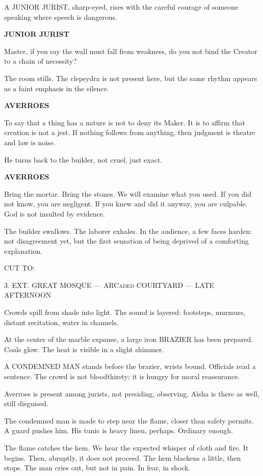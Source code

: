 \documentclass[12pt]{article}
\newlength{\charindent}
\newlength{\dialogueindent}
\newlength{\dialoguewidth}
\newlength{\transitionindent}
\newcommand{\slug}[1]{\vspace{1.25em}\textsc{#1}\vspace{0.5em}}
\newcommand{\action}[1]{#1}
\newcommand{\character}[1]{%
  \par\vspace{0.75em}%
  \hspace*{\charindent}\textbf{#1}%
}
\newcommand{\dialogue}[1]{%
  \par\nobreak
  \hspace*{\dialogueindent}%
  \begin{minipage}[t]{\dialoguewidth}
  #1
  \end{minipage}
}
\newcommand{\transition}[1]{%
  \par\vspace{1em}%
  \hspace*{\transitionindent}\textsc{#1}%
}
\begin{document}
\action{A JUNIOR JURIST, sharp-eyed, rises with the careful courage of someone speaking where speech is dangerous.}

\character{JUNIOR JURIST}
\dialogue{Master, if you say the wall must fall from weakness, do you not bind the Creator to a chain of necessity?}

\action{The room stills. The clepsydra is not present here, but the same rhythm appears as a faint emphasis in the silence.}

\character{AVERROES}
\dialogue{To say that a thing has a nature is not to deny its Maker. It is to affirm that creation is not a jest. If nothing follows from anything, then judgment is theatre and law is noise.}

\action{He turns back to the builder, not cruel, just exact.}

\character{AVERROES}
\dialogue{Bring the mortar. Bring the stones. We will examine what you used. If you did not know, you are negligent. If you knew and did it anyway, you are culpable. God is not insulted by evidence.}

\action{The builder swallows. The laborer exhales. In the audience, a few faces harden: not disagreement yet, but the first sensation of being deprived of a comforting explanation.}

\transition{CUT TO:}

\slug{3. EXT. GREAT MOSQUE --- ARCaded COURTYARD --- LATE AFTERNOON}

\action{Crowds spill from shade into light. The sound is layered: footsteps, murmurs, distant recitation, water in channels.}

\action{At the center of the marble expanse, a large iron BRAZIER has been prepared. Coals glow. The heat is visible in a slight shimmer.}

\action{A CONDEMNED MAN stands before the brazier, wrists bound. Officials read a sentence. The crowd is not bloodthirsty; it is hungry for moral reassurance.}

\action{Averroes is present among jurists, not presiding, observing. A\`isha is there as well, still disguised.}

\action{The condemned man is made to step near the flame, closer than safety permits. A guard pushes him. His tunic is heavy linen, perhaps. Ordinary enough.}

\action{The flame catches the hem. We hear the expected whisper of cloth and fire. It begins. Then, abruptly, it does not proceed. The hem blackens a little, then stops. The man cries out, but not in pain. In fear, in shock.}
\end{document}
